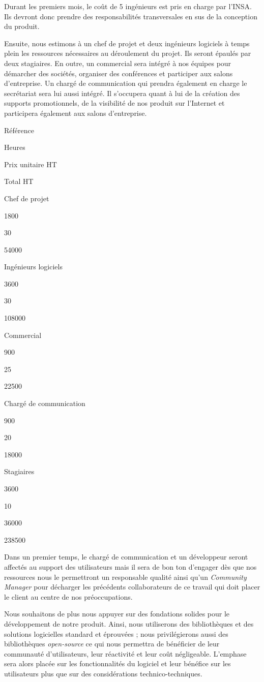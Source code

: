 \documentclass[10pt,twocolumn,a4paper,utf8x]{article}
\begin{document}
Durant les premiers mois, le coût de 5 ingénieurs est pris en charge par
l'INSA. Ils devront donc prendre des responsabilités transversales en
sus de la conception du produit.

Ensuite, nous estimons à un chef de projet et deux ingénieurs logiciels
à temps plein les ressources nécessaires au déroulement du projet. Ils
seront épaulés par deux stagiaires. En outre, un commercial sera intégré
à nos équipes pour démarcher des sociétés, organiser des conférences et
participer aux salons d'entreprise. Un chargé de communication qui
prendra également en charge le secrétariat sera lui aussi intégré. Il
s'occupera quant à lui de la création des supports promotionnels, de la
visibilité de nos produit sur l'Internet et participera également aux
salons d'entreprise.

Référence

Heures

Prix unitaire HT

Total HT

Chef de projet

1800

30

54000

Ingénieurs logiciels

3600

30

108000

Commercial

900

25

22500

Chargé de communication

900

20

18000

Stagiaires

3600

10

36000

238500

Dans un premier temps, le chargé de communication et un développeur
seront affectés au support des utilisateurs mais il sera de bon ton
d'engager dès que nos ressources nous le permettront un responsable
qualité ainsi qu'un \emph{Community Manager} pour décharger les
précédents collaborateurs de ce travail qui doit placer le client au
centre de nos préoccupations.

Nous souhaitons de plus nous appuyer sur des fondations solides pour le
développement de notre produit. Ainsi, nous utiliserons des
bibliothèques et des solutions logicielles standard et éprouvées ; nous
privilégierons aussi des bibliothèques \emph{open-source} ce qui nous
permettra de bénéficier de leur communauté d'utilisateurs, leur
réactivité et leur coût négligeable. L'emphase sera alors placée sur les
fonctionnalités du logiciel et leur bénéfice sur les utilisateurs plus
que sur des considérations technico-techniques.
\end{document}
